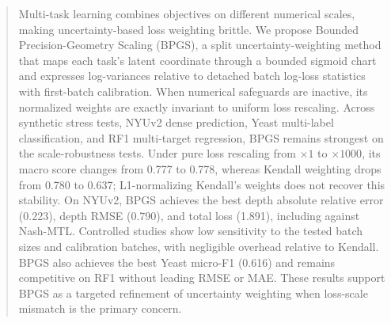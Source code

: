 \begin{abstract}
Multi-task learning combines objectives on different numerical scales, making uncertainty-based loss weighting brittle. We propose Bounded Precision-Geometry Scaling (BPGS), a split uncertainty-weighting method that maps each task's latent coordinate through a bounded sigmoid chart and expresses log-variances relative to detached batch log-loss statistics with first-batch calibration. When numerical safeguards are inactive, its normalized weights are exactly invariant to uniform loss rescaling. Across synthetic stress tests, NYUv2 dense prediction, Yeast multi-label classification, and RF1 multi-target regression, BPGS remains strongest on the scale-robustness tests. Under pure loss rescaling from $\times 1$ to $\times 1000$, its macro score changes from 0.777 to 0.778, whereas Kendall weighting drops from 0.780 to 0.637; L1-normalizing Kendall's weights does not recover this stability. On NYUv2, BPGS achieves the best depth absolute relative error (0.223), depth RMSE (0.790), and total loss (1.891), including against Nash-MTL. Controlled studies show low sensitivity to the tested batch sizes and calibration batches, with negligible overhead relative to Kendall. BPGS also achieves the best Yeast micro-F1 (0.616) and remains competitive on RF1 without leading RMSE or MAE. These results support BPGS as a targeted refinement of uncertainty weighting when loss-scale mismatch is the primary concern.
\end{abstract}

